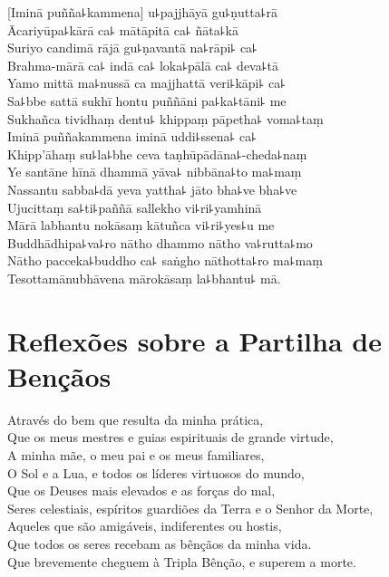 \documentclass[
  babelLanguage=portuguese,
  final,
]{chantingbook}
\begin{document}
[Iminā puñña꜕kammena] u꜕pajjhāyā gu꜕ṇutta꜕rā\\
Ācariyūpa꜕kārā ca꜕ mātāpitā ca꜕ ñāta꜕kā\\
Suriyo candimā rājā gu꜕ṇavantā na꜕rāpi꜕ ca꜕\\
Brahma-mārā ca꜕ indā ca꜕ loka꜕pālā ca꜕ deva꜕tā\\
Yamo mittā ma꜕nussā ca majjhattā veri꜕kāpi꜕ ca꜕\\
Sa꜕bbe sattā sukhī hontu puññāni pa꜕ka꜕tāni꜕ me\\
Sukhañca tividhaṃ dentu꜕ khippaṃ pāpetha꜕ voma꜕taṃ\\
Iminā puññakammena iminā uddi꜕ssena꜕ ca꜕\\
Khipp'āhaṃ su꜕la꜕bhe ceva taṇhūpādāna꜕-cheda꜕naṃ\\
Ye santāne hīnā dhammā yāva꜕ nibbāna꜕to ma꜕maṃ\\
Nassantu sabba꜕dā yeva yattha꜕ jāto bha꜕ve bha꜕ve\\
Ujucittaṃ sa꜕ti꜕paññā sallekho vi꜕ri꜕yamhinā\\
Mārā labhantu nokāsaṃ kātuñca vi꜕ri꜕yes꜕u me\\
Buddhādhipa꜕va꜕ro nātho dhammo nātho va꜕rutta꜕mo\\
Nātho pacceka꜕buddho ca꜕ saṅgho nāthotta꜕ro ma꜕maṃ\\
Tesottamānubhāvena mārokāsaṃ la꜕bhantu꜕ mā.

\chapter{Reflexões sobre a Partilha de Bençãos}

\enlargethispage{\baselineskip}

\begin{leader}
\end{leader}

Através do bem que resulta da minha prática,\\
Que os meus mestres e guias espirituais de grande virtude,\\
A minha mãe, o meu pai e os meus familiares,\\
O Sol e a Lua, e todos os líderes virtuosos do mundo,\\
Que os Deuses mais elevados e as forças do mal,\\
Seres celestiais, espíritos guardiões da Terra e o Senhor da Morte,\\
Aqueles que são amigáveis, indiferentes ou hostis,\\
Que todos os seres recebam as bênçãos da minha vida.\\
Que brevemente cheguem à Tripla Bênção, e superem a morte.
\end{document}
